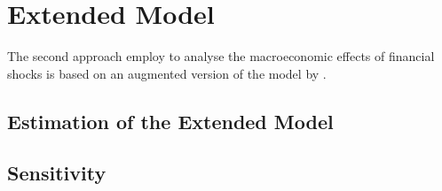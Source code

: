 \newpage

\section{Extended Model}
\label{sec:extended_model}

The second approach \citeauthor{JERMANNfinancial} employ to analyse the macroeconomic effects of financial shocks is based on an augmented version of the model by \citet{SEMTSshocks}. 


\subsection{Estimation of the Extended Model}
\label{sec:extended_model_estimation}

\begin{table}
  \small
  \centering
  \label{tab:estimation}
\end{table}

\subsection{Sensitivity}
\label{sec:sensitivity}
